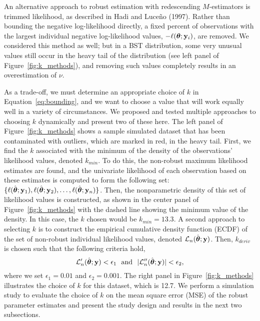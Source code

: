 \documentclass[12pt]{article}
\def\btheta{{\boldsymbol \theta}}
\def\by{{\bf y}}
\def\btheta{{\boldsymbol \theta}}
\def\by{{\bf y}}
\begin{document}
\begin{doublespacing}
An alternative approach to robust estimation with redescending $M$-estimators is trimmed likelihood, as described  in Hadi and Luce\~no (1997).  Rather than bounding the negative log-likelihood directly, a fixed percent of observations with the largest individual negative log-likelihood values, $-\ell(\btheta;\by_i)$, are removed.  We considered this method as well; but in a BST distribution,  some very unusual values still occur in the heavy tail of the distribution (see left panel of Figure~\ref{fig:k_methods}), and removing such values completely results in an overestimation of $\nu$.



As a trade-off, we must  determine an appropriate choice of $k$ in Equation~\eqref{eq:bounding}, and we want to choose a value that will work equally well in a  variety of circumstances. We proposed and tested multiple approaches  to choosing $k$ dynamically and present two of these here.  The left panel of Figure~\ref{fig:k_methods} shows a sample simulated dataset that has been contaminated with outliers, which are marked in red, in the heavy tail.  First, we find the $k$ associated with the minimum of the density of the observations' likelihood values, denoted $k_{min}$. To do this, the non-robust maximum likelihood estimates are found, and the univariate likelihood of each observation based on these estimates is computed to form the following set:  $\{\ell(\hat\btheta;\by_1), \ell(\hat\btheta;\by_2), \ldots, \ell(\hat\btheta;\by_n)\}$.  Then, the nonparametric density of this  set of likelihood values is constructed, as shown in the center panel of Figure~\ref{fig:k_methods} with the dashed line showing the minimum value of the density.   In this case, the $k$ chosen would be $k_{min}=13.3$.   A second approach to selecting $k$ is to construct the empirical cumulative density function (ECDF) of the set of non-robust individual likelihood values, denoted $\mathcal{L}_n(\hat\btheta;\by)$.  Then,  $k_{deriv}$ is chosen such that the following criteria hold,
$$\mathcal{L}_n'(\hat\btheta;\by)<\epsilon_1 \,\,\,\, \mbox{and} \,\,\,\, |\mathcal{L}_n''(\hat\btheta;\by)| < \epsilon_2,$$
where we set $\epsilon_1 = 0.01$ and $\epsilon_2= 0.001$.  The right panel in Figure~\ref{fig:k_methods} illustrates the choice of $k$ for this dataset, which is 12.7.  We perform  a simulation study to evaluate the choice of $k$ on the mean square error (MSE) of the robust parameter estimates and present the study design and results in the next two subsections.






\end{doublespacing}
\end{document}
